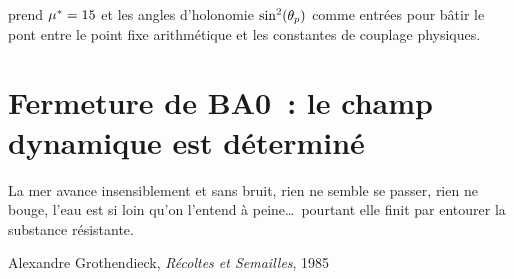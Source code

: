 \documentclass[12pt,a4paper]{article}
\begin{document}
\medskip
\cite{companion_M5} prend ${\mu^{*}} = 15$ et les angles d'holonomie
$\sin^2(\theta_{p})$ comme entrées pour bâtir le pont entre le point fixe
arithmétique et les constantes de couplage physiques.


\newpage

\section{Fermeture de BA0~: le champ dynamique est déterminé}
\label{sec:BA0_closing}

\epigraph{La mer avance insensiblement et sans bruit, rien ne semble
se passer, rien ne bouge, l'eau est si loin qu'on l'entend à peine\ldots\
pourtant elle finit par entourer la substance résistante.}{Alexandre
Grothendieck, \textit{Récoltes et Semailles}, 1985}

\vspace{1em}
\end{document}
